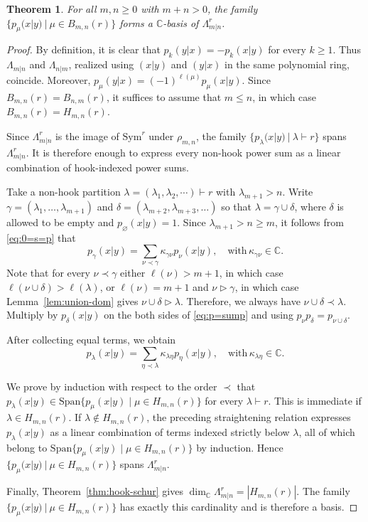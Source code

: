 \documentclass[11pt]{amsart}
\numberwithin{equation}{section}
\theoremstyle{plain}
\newtheorem{thm}{Theorem}[section]
\theoremstyle{definition}
\theoremstyle{remark}
\begin{document}
\begin{thm}\label{thm:gl-p-basis}
For all $m,n\geq0$ with $m+n>0$, the family
$\{p_\mu(x|y)~|~\mu\in B_{m,n}(r)\}$ forms a $\mathbb C$-basis of $\Lambda_{m|n}^r$.
\end{thm}

\begin{proof}
By definition, it is clear that
$p_k(y|x)=-p_k(x|y)$ for every $k\geq1$.
Thus $\Lambda_{m|n}$ and $\Lambda_{n|m}$, realized using
$(x|y)$ and $(y|x)$ in the same polynomial ring, coincide.
Moreover, $p_\mu(y|x)=(-1)^{\ell(\mu)}p_\mu(x|y)$.
Since $B_{m,n}(r)=B_{n,m}(r)$, it suffices to assume that
$m\leq n$, in which case $B_{m,n}(r)=H_{m,n}(r)$.

Since $\Lambda_{m|n}^r$ is the image of
$\mathrm{Sym}^r$ under $\rho_{m,n}$, the family
$\{p_\lambda(x|y)~|~\lambda\vdash r\}$ spans
$\Lambda_{m|n}^r$. It is therefore enough to express every
non-hook power sum as a linear combination of hook-indexed power
sums.

Take a non-hook partition $\lambda=(\lambda_1,\lambda_2,\cdots)\vdash r$ with $\lambda_{m+1}>n$. Write
$\gamma=(\lambda_1,\ldots,\lambda_{m+1})$ and
$\delta=(\lambda_{m+2},\lambda_{m+3},\ldots)$ so that $\lambda=\gamma\cup\delta$,
where $\delta$ is allowed to be empty and
$p_\varnothing(x|y)=1$. Since
$\lambda_{m+1}>n\geq m$, it follows from \eqref{eq:0=s=p} that
\begin{equation}\label{eq:p=sump}
p_\gamma(x|y)
=
\sum_{\nu\prec\gamma}
\kappa_{\gamma\nu}p_\nu(x|y),
\quad \text{with}\, 
\kappa_{\gamma\nu}\in\mathbb C.
\end{equation}
Note that for every $\nu\prec\gamma$ either
$\ell(\nu)>m+1$, in which case
$\ell(\nu\cup\delta)>\ell(\lambda)$, or
$\ell(\nu)=m+1$ and $\nu\triangleright\gamma$, in which case
Lemma~\ref{lem:union-dom} gives
$\nu\cup\delta\triangleright\lambda$. Therefore, we always have
$\nu\cup\delta\prec\lambda$. 
Multiply by $p_\delta(x|y)$ on the both sides of \eqref{eq:p=sump} and using
$p_\nu p_\delta=p_{\nu\cup\delta}$. 

After collecting equal terms, we obtain
$$
p_\lambda(x|y)
=
\sum_{\eta\prec\lambda}
\kappa_{\lambda\eta}p_\eta(x|y),
\quad \text{with}\,
\kappa_{\lambda\eta}\in\mathbb C.
$$

We prove by induction with respect to the order $\prec$ that $p_\lambda(x|y)\in \mathrm{Span}\{p_\mu(x|y)\mid\mu\in H_{m,n}(r)\}$ for every
$\lambda\vdash r$. This is immediate if $\lambda\in H_{m,n}(r)$.
If $\lambda\notin H_{m,n}(r)$, the preceding straightening relation
expresses $p_\lambda(x|y)$ as a linear combination of terms indexed
strictly below $\lambda$, all of which belong to $\mathrm{Span}\{p_\mu(x|y)\mid\mu\in H_{m,n}(r)\}$ by induction.
Hence $\{p_\mu(x|y)~|~\mu\in H_{m,n}(r)\}$ spans $\Lambda_{m|n}^r$.

Finally, Theorem~\ref{thm:hook-schur} gives
$\dim_{\mathbb C}\Lambda_{m|n}^r=|H_{m,n}(r)|$.
The family $\{p_\mu(x|y)~|~\mu\in H_{m,n}(r)\}$ has exactly this cardinality and is
therefore a basis.
\end{proof}
\end{document}
